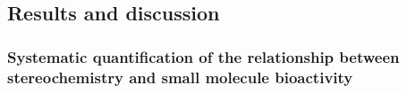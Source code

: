 \subsection{Results and discussion}



\subsubsection{Systematic quantification of the relationship between stereochemistry and small molecule bioactivity}
\label{Stereoisomers_Rel_Stereo_Bioactivity}

